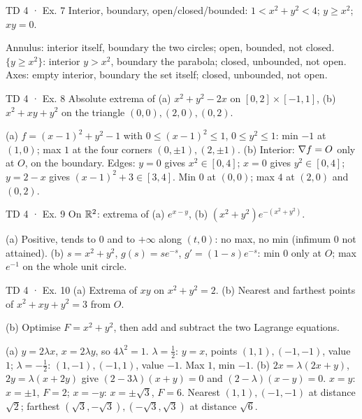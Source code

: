 \begin{problem}{TD 4 · Ex. 7}
Interior, boundary, open/closed/bounded: $1<x^2+y^2<4$; $y\ge x^2$; $xy=0$.
\end{problem}
\begin{solution}
Annulus: interior itself, boundary the two circles; open, bounded, not closed.
$\{y\ge x^2\}$: interior $y>x^2$, boundary the parabola; closed, unbounded, not open.
Axes: empty interior, boundary the set itself; closed, unbounded, not open.
\end{solution}

\begin{problem}{TD 4 · Ex. 8}
Absolute extrema of (a) $x^2+y^2-2x$ on $[0,2]\times[-1,1]$, (b) $x^2+xy+y^2$ on the triangle
$(0,0),(2,0),(0,2)$.
\end{problem}
\begin{solution}
(a) $f=(x-1)^2+y^2-1$ with $0\le(x-1)^2\le1$, $0\le y^2\le1$: min $-1$ at $(1,0)$; max $1$ at the
four corners $(0,\pm1),(2,\pm1)$.
(b) Interior: $\nabla f=O$ only at $O$, on the boundary. Edges: $y=0$ gives $x^2\in[0,4]$; $x=0$
gives $y^2\in[0,4]$; $y=2-x$ gives $(x-1)^2+3\in[3,4]$. Min $0$ at $(0,0)$; max $4$ at $(2,0)$
and $(0,2)$.
\end{solution}

\begin{problem}{TD 4 · Ex. 9}
On $\mathbb{R}^2$: extrema of (a) $e^{x-y}$, (b) $(x^2+y^2)e^{-(x^2+y^2)}$.
\end{problem}
\begin{solution}
(a) Positive, tends to $0$ and to $+\infty$ along $(t,0)$: no max, no min (infimum $0$ not attained).
(b) $s=x^2+y^2$, $g(s)=se^{-s}$, $g'=(1-s)e^{-s}$: min $0$ only at $O$; max $e^{-1}$ on the whole
unit circle.
\end{solution}

\begin{problem}{TD 4 · Ex. 10}
(a) Extrema of $xy$ on $x^2+y^2=2$. (b) Nearest and farthest points of $x^2+xy+y^2=3$ from $O$.
\end{problem}
\begin{hint}(b) Optimise $F=x^2+y^2$, then add and subtract the two Lagrange equations.\end{hint}
\begin{solution}
(a) $y=2\lambda x$, $x=2\lambda y$, so $4\lambda^2=1$. $\lambda=\tfrac12$: $y=x$, points $(1,1),(-1,-1)$,
value $1$; $\lambda=-\tfrac12$: $(1,-1),(-1,1)$, value $-1$. Max $1$, min $-1$.
(b) $2x=\lambda(2x+y)$, $2y=\lambda(x+2y)$ give $(2-3\lambda)(x+y)=0$ and $(2-\lambda)(x-y)=0$.
$x=y$: $x=\pm1$, $F=2$; $x=-y$: $x=\pm\sqrt3$, $F=6$. Nearest $(1,1),(-1,-1)$ at distance
$\sqrt2$; farthest $(\sqrt3,-\sqrt3),(-\sqrt3,\sqrt3)$ at distance $\sqrt6$.
\end{solution}

